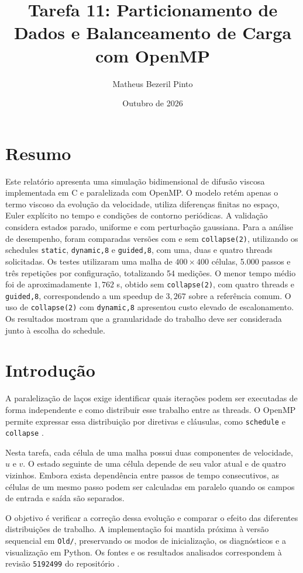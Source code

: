 \documentclass[12pt,a4paper]{article}
\title{\textbf{Tarefa 11: Particionamento de Dados e Balanceamento de Carga com OpenMP}}
\author{Matheus Bezeril Pinto}
\date{Outubro de 2026}
\begin{document}
\maketitle

\section*{Resumo}
Este relatório apresenta uma simulação bidimensional de difusão viscosa implementada em C e paralelizada com OpenMP. O modelo retém apenas o termo viscoso da evolução da velocidade, utiliza diferenças finitas no espaço, Euler explícito no tempo e condições de contorno periódicas. A validação considera estados parado, uniforme e com perturbação gaussiana. Para a análise de desempenho, foram comparadas versões com e sem \texttt{collapse(2)}, utilizando os schedules \texttt{static}, \texttt{dynamic,8} e \texttt{guided,8}, com uma, duas e quatro threads solicitadas. Os testes utilizaram uma malha de $400\times400$ células, 5.000 passos e três repetições por configuração, totalizando 54 medições. O menor tempo médio foi de aproximadamente $1{,}762$ s, obtido sem \texttt{collapse(2)}, com quatro threads e \texttt{guided,8}, correspondendo a um speedup de $3{,}267$ sobre a referência comum. O uso de \texttt{collapse(2)} com \texttt{dynamic,8} apresentou custo elevado de escalonamento. Os resultados mostram que a granularidade do trabalho deve ser considerada junto à escolha do schedule.

\section{Introdução}
A paralelização de laços exige identificar quais iterações podem ser executadas de forma independente e como distribuir esse trabalho entre as threads. O OpenMP permite expressar essa distribuição por diretivas e cláusulas, como \texttt{schedule} e \texttt{collapse} \cite{openmp}.

Nesta tarefa, cada célula de uma malha possui duas componentes de velocidade, $u$ e $v$. O estado seguinte de uma célula depende de seu valor atual e de quatro vizinhos. Embora exista dependência entre passos de tempo consecutivos, as células de um mesmo passo podem ser calculadas em paralelo quando os campos de entrada e saída são separados.

O objetivo é verificar a correção dessa evolução e comparar o efeito das diferentes distribuições de trabalho. A implementação foi mantida próxima à versão sequencial em \texttt{Old/}, preservando os modos de inicialização, os diagnósticos e a visualização em Python. Os fontes e os resultados analisados correspondem à revisão \texttt{5192499} do repositório \cite{repositorio}.
\end{document}
